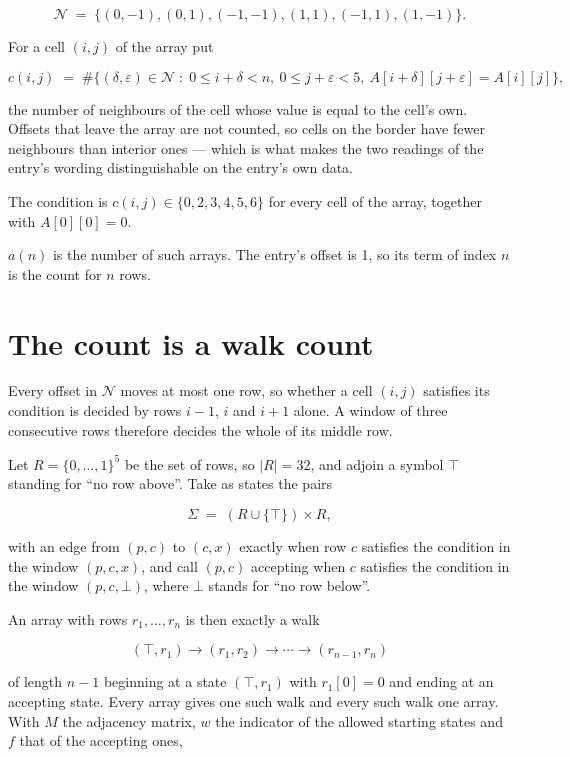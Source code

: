 \documentclass[11pt]{article}
\theoremstyle{definition}
\begin{document}
\[\mathcal{N} \;=\; \{(0,-1), (0,1), (-1,-1), (1,1), (-1,1), (1,-1)\}.\]

For a cell $(i,j)$ of the array put

\[c(i,j) \;=\; \#\bigl\{(\delta,\varepsilon)\in\mathcal{N} \;:\; 0\le i+\delta<n,\ 0\le j+\varepsilon<5,\ A[i+\delta][j+\varepsilon] = A[i][j]\bigr\},\]

the number of neighbours of the cell whose value is equal to the cell's own. Offsets that leave the array are not counted, so cells on the border have fewer neighbours than interior ones --- which is what makes the two readings of the entry's wording distinguishable on the entry's own data.

The condition is $c(i,j) \in \{0, 2, 3, 4, 5, 6\}$ for every cell of the array, together with $A[0][0]=0$.

$a(n)$ is the number of such arrays. The entry's offset is 1, so its term of index $n$ is the count for $n$ rows.

\section{The count is a walk count}

Every offset in $\mathcal{N}$ moves at most one row, so whether a cell $(i,j)$ satisfies its condition is decided by rows $i-1$, $i$ and $i+1$ alone. A window of three consecutive rows therefore decides the whole of its middle row.

Let $R = \{0,\dots,1\}^{5}$ be the set of rows, so $|R| = 32$, and adjoin a symbol $\top$ standing for ``no row above''. Take as states the pairs

\[\Sigma \;=\; (R \cup \{\top\}) \times R,\]

with an edge from $(p,c)$ to $(c,x)$ exactly when row $c$ satisfies the condition in the window $(p,c,x)$, and call $(p,c)$ accepting when $c$ satisfies the condition in the window $(p,c,\bot)$, where $\bot$ stands for ``no row below''.

An array with rows $r_1,\dots,r_n$ is then exactly a walk

\[(\top,r_1) \to (r_1,r_2) \to \cdots \to (r_{n-1},r_n)\]

of length $n-1$ beginning at a state $(\top,r_1)$ with $r_1[0]=0$ and ending at an accepting state. Every array gives one such walk and every such walk one array. With $M$ the adjacency matrix, $w$ the indicator of the allowed starting states and $f$ that of the accepting ones,
\end{document}
